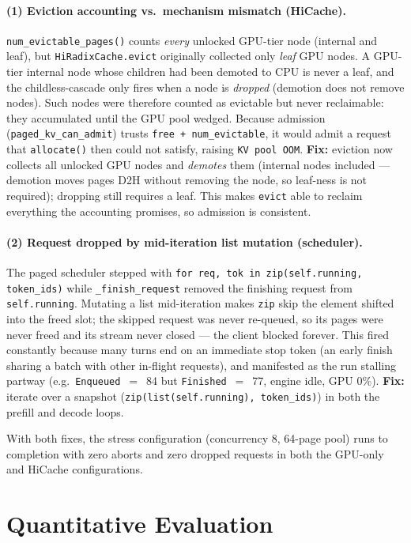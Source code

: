 \documentclass[11pt]{article}
\begin{document}
\paragraph{(1) Eviction accounting vs.\ mechanism mismatch (HiCache).}
\texttt{num\_evictable\_pages()} counts \emph{every} unlocked GPU-tier node (internal and leaf), but \texttt{HiRadixCache.evict} originally collected only \emph{leaf} GPU nodes. A GPU-tier internal node whose children had been demoted to CPU is never a leaf, and the childless-cascade only fires when a node is \emph{dropped} (demotion does not remove nodes). Such nodes were therefore counted as evictable but never reclaimable: they accumulated until the GPU pool wedged. Because admission (\texttt{paged\_kv\_can\_admit}) trusts \texttt{free + num\_evictable}, it would admit a request that \texttt{allocate()} then could not satisfy, raising \texttt{KV pool OOM}. \textbf{Fix:} eviction now collects all unlocked GPU nodes and \emph{demotes} them (internal nodes included --- demotion moves pages D2H without removing the node, so leaf-ness is not required); dropping still requires a leaf. This makes \texttt{evict} able to reclaim everything the accounting promises, so admission is consistent.

\paragraph{(2) Request dropped by mid-iteration list mutation (scheduler).}
The paged scheduler stepped with \texttt{for req, tok in zip(self.running, token\_ids)} while \texttt{\_finish\_request} removed the finishing request from \texttt{self.running}. Mutating a list mid-iteration makes \texttt{zip} skip the element shifted into the freed slot; the skipped request was never re-queued, so its pages were never freed and its stream never closed --- the client blocked forever. This fired constantly because many turns end on an immediate stop token (an early finish sharing a batch with other in-flight requests), and manifested as the run stalling partway (e.g.\ \texttt{Enqueued}~$=$~84 but \texttt{Finished}~$=$~77, engine idle, GPU 0\%). \textbf{Fix:} iterate over a snapshot (\texttt{zip(list(self.running), token\_ids)}) in both the prefill and decode loops.

With both fixes, the stress configuration (concurrency 8, 64-page pool) runs to completion with zero aborts and zero dropped requests in both the GPU-only and HiCache configurations.

\section{Quantitative Evaluation}
\end{document}
